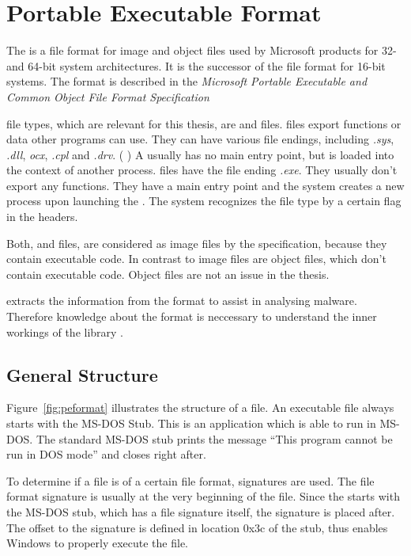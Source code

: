 \chapter{Portable Executable Format} \label{chap:peformat}

The \PE{} is a file format for image and object files used by Microsoft products for 32- and 64-bit system architectures. It is the successor of the \NZ{} file format for 16-bit systems. The \PE{} format is described in the \emph{Microsoft Portable Executable and Common Object File Format Specification} \cite{pespec}

\PE{} file types, which are relevant for this thesis, are \DLL{} and \EXE{} files. \DLL{} files export functions or data other programs can use. They can have various file endings, including \emph{.sys}, \emph{.dll}, \emph{ocx}, \emph{.cpl} and \emph{.drv}. (\cf{} \cite{micrdll}) A \DLL{} usually has no main entry point, but is loaded into the context of another process.
\EXE{} files have the file ending \emph{.exe}. They usually don't export any functions. They have a main entry point and the system creates a new process upon launching the \EXE{}.
The system recognizes the file type by a certain flag in the headers.  %

Both, \EXE{} and \DLL{} files, are considered as image files by the specification, because they contain executable code.  In contrast to image files are object files, which don't contain executable code. Object files are not an issue in the thesis.

\portex{} extracts the information from the \PE{} format to assist in analysing malware. Therefore knowledge about the \PE{} format is neccessary to understand the inner workings of the library \portex{}.

\section{General Structure}

Figure~\ref{fig:peformat} illustrates the structure of a \PE{} file. An executable \PE{} file always starts with the MS-DOS Stub. This is an application which is able to run in MS-DOS. The standard MS-DOS stub prints the message \enquote{This program cannot be run in DOS mode} and closes right after. 

To determine if a file is of a certain file format, signatures are used. The file format signature is usually at the very beginning of the file. Since the \PE{} starts with the MS-DOS stub, which has a file signature itself, the \PE{} signature is placed after.  The offset to the \PE{} signature is defined in location 0x3c of the stub, thus enables Windows to properly execute the \PE{} file. 

